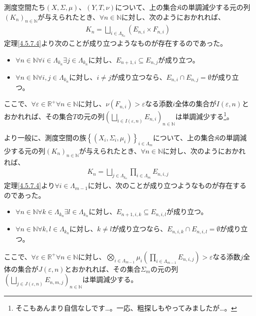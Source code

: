 \documentclass[dvipdfmx]{jsarticle}
\begin{document}
\begin{thm}\label{4.5.7.5}
測度空間たち$(X,\varSigma,\mu)$、$(Y,T,\nu)$について、上の集合$\mathfrak{K}$の単調減少する元の列$\left( K_{n} \right)_{n \in \mathbb{N}}$が与えられたとき、$\forall n \in \mathbb{N}$に対し、次のようにおかれれば、
\begin{align*}
K_{n} = \bigsqcup_{i \in \varLambda_{k_{n}}} \left( E_{n,i} \times F_{n,i} \right)
\end{align*}
定理\ref{4.5.7.4}より次のことが成り立つようなものが存在するのであった。
\begin{itemize}
\item
  $\forall n \in \mathbb{N}\forall i \in \varLambda_{k_{n}}\exists j \in \varLambda_{k_{n}}$に対し、$E_{n + 1,i} \subseteq E_{n,j}$が成り立つ。
\item
  $\forall n \in \mathbb{N}\forall i,j \in \varLambda_{k_{n}}$に対し、$i \neq j$が成り立つなら、$E_{n,i} \cap E_{n,j} = \emptyset$が成り立つ。
\end{itemize}
ここで、$\forall\varepsilon \in \mathbb{R}^{+}\forall n \in \mathbb{N}$に対し、$\nu\left( F_{n,i} \right) > \varepsilon$なる添数$i$全体の集合が$I(\varepsilon,n)$とおかれれば、その集合$T$の元の列$\left( \bigsqcup_{i \in I(\varepsilon,n)} E_{n,i} \right)_{n \in \mathbb{N}}$は単調減少する\footnote{そこもあんまり自信なしです…。一応、粗探しもやってみましたが…。}。\par
より一般に、測度空間の族$\left\{ \left( X_{i},\varSigma_{i},\mu_{i} \right) \right\}_{i \in \varLambda_{m}}$について、上の集合$\mathfrak{K}$の単調減少する元の列$\left( K_{n} \right)_{n \in \mathbb{N}}$が与えられたとき、$\forall n \in \mathbb{N}$に対し、次のようにおかれれば、
\begin{align*}
K_{n} = \bigsqcup_{j \in \varLambda_{k_{n}}} {\prod_{i \in \varLambda_{m} } E_{n,i,j}}
\end{align*}
定理\ref{4.5.7.4}より$\forall i \in \varLambda_{m - 1}$に対し、次のことが成り立つようなものが存在するのであった。
\begin{itemize}
\item
  $\forall n \in \mathbb{N}\forall k \in \varLambda_{k_{n}}\exists l \in \varLambda_{k_{n}}$に対し、$E_{n + 1,i,k} \subseteq E_{n,i,l}$が成り立つ。
\item
  $\forall n \in \mathbb{N}\forall k,l \in \varLambda_{k_{n}}$に対し、$k \neq l$が成り立つなら、$E_{n,i,k} \cap E_{n,i,l} = \emptyset$が成り立つ。
\end{itemize}
ここで、$\forall\varepsilon \in \mathbb{R}^{+}\forall n \in \mathbb{N}$に対し、$\bigotimes_{i \in \varLambda_{m - 1}} \mu_{i}\left( \prod_{i \in \varLambda_{m - 1}} E_{n,i,j} \right) > \varepsilon$なる添数$j$全体の集合が$J(\varepsilon,n)$とおかれれば、その集合$\varSigma_{m}$の元の列$\left( \bigsqcup_{j \in J(\varepsilon,n)} E_{n,m,j} \right)_{n \in \mathbb{N}}$は単調減少する。
\end{thm}
\end{document}
